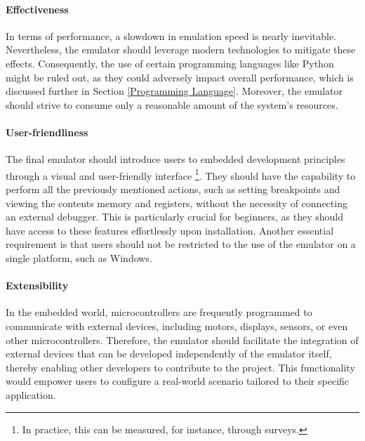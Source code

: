 \documentclass[english, ing, kiv, he, iso690numb, pdf]{fasthesis}
\begin{document}
	\paragraph{Effectiveness}
	
	In terms of performance, a slowdown in emulation speed is nearly inevitable. Nevertheless, the emulator should leverage modern technologies to mitigate these effects. Consequently, the use of certain programming languages like Python might be ruled out, as they could adversely impact overall performance, which is discussed further in Section \ref{Programming Language}. Moreover, the emulator should strive to consume only a reasonable amount of the system's resources.
	
	\paragraph{User-friendliness}
	
	The final emulator should introduce users to embedded development principles through a visual and user-friendly interface \footnote{In practice, this can be measured, for instance, through surveys.}. They should have the capability to perform all the previously mentioned actions, such as setting breakpoints and viewing the contents memory and registers, without the necessity of connecting an external debugger. This is particularly crucial for beginners, as they should have access to these features effortlessly upon installation. Another essential requirement is that users should not be restricted to the use of the emulator on a single platform, such as Windows.
	
	\paragraph{Extensibility}
	
	In the embedded world, microcontrollers are frequently programmed to communicate with external devices, including motors, displays, sensors, or even other microcontrollers. Therefore, the emulator should facilitate the integration of external devices that can be developed independently of the emulator itself, thereby enabling other developers to contribute to the project. This functionality would empower users to configure a real-world scenario tailored to their specific application.
	
	
\end{document}
